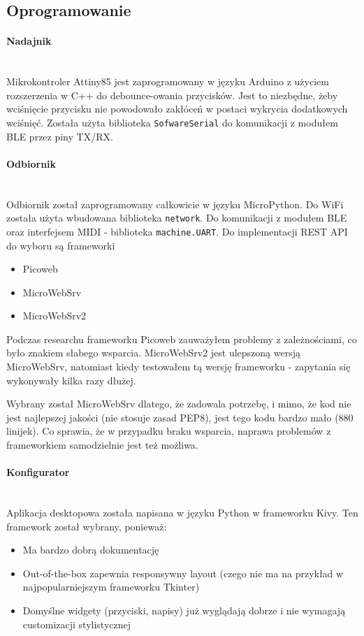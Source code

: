 \documentclass[eng,printmode]{mgr}
\begin{document}
\subsection{Oprogramowanie}
\paragraph{Nadajnik}\mbox{} \\

Mikrokontroler Attiny85 jest zaprogramowany w języku Arduino z użyciem rozszerzenia w C++ do debounce-owania przycisków. Jest to niezbędne, żeby wciśnięcie przycisku nie powodowało zakłóceń w postaci wykrycia dodatkowych wciśnięć.
Została użyta biblioteka \texttt{SofwareSerial} do komunikacji z modułem BLE przez piny TX/RX.
\paragraph{Odbiornik}\mbox{} \\

Odbiornik został zaprogramowany całkowicie w języku MicroPython. Do WiFi została użyta wbudowana biblioteka \texttt{network}. Do komunikacji z modułem BLE oraz interfejsem MIDI - biblioteka \texttt{machine.UART}.
Do implementacji REST API do wyboru są frameworki
\begin{itemize}
\item Picoweb
\item MicroWebSrv
\item MicroWebSrv2
\end{itemize}

Podczas researchu frameworku Picoweb zauważyłem problemy z zależnościami, co było znakiem słabego wsparcia. MicroWebSrv2 jest ulepszoną wersją MicroWebSrv, natomiast kiedy testowałem tą wersję frameworku - zapytania się wykonywały kilka razy dłużej.

Wybrany został MicroWebSrv dlatego, że zadowala potrzebę, i mimo, że kod nie jest najlepszej jakości (nie stosuje zasad PEP8), jest tego kodu bardzo mało (880 linijek). Co sprawia, że w przypadku braku wsparcia, naprawa problemów z frameworkiem samodzielnie jest też możliwa.
\paragraph{Konfigurator}\mbox{} \\

Aplikacja desktopowa została napisana w języku Python w frameworku Kivy. Ten framework został wybrany, ponieważ:
\begin{itemize}
\item Ma bardzo dobrą dokumentację
\item Out-of-the-box zapewnia responsywny layout (czego nie ma na przykład w najpopularniejszym frameworku Tkinter)
\item Domyślne widgety (przyciski, napisy) już wyglądają dobrze i nie wymagają customizacji stylistycznej
\end{itemize}
\end{document}

